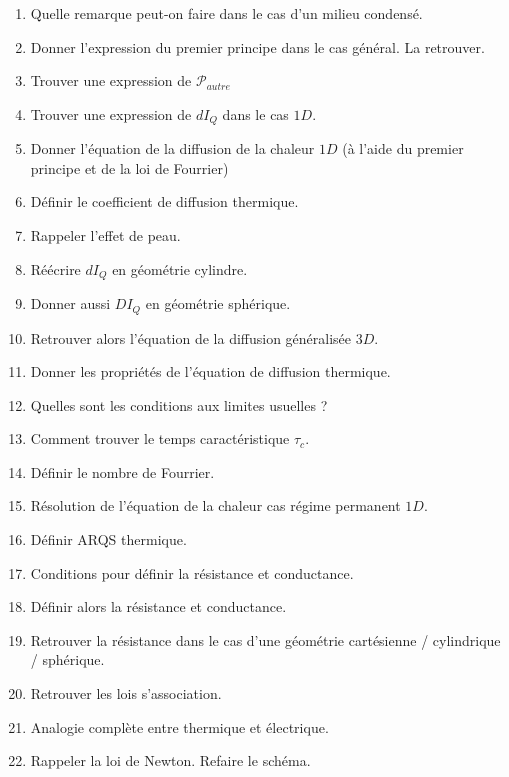 \documentclass[a4paper, 11pt, hidelinks]{article}
\begin{document}
\begin{enumerate}
    \item Quelle remarque peut-on faire dans le cas d'un milieu condensé. \cite{Chapitre20}
    \item Donner l'expression du premier principe dans le cas général. La retrouver. \cite{Chapitre20}
    \item Trouver une expression de $\mathscr{P}_{autre}$ \cite{Chapitre20}
    \item Trouver une expression de $dI_Q$ dans le cas $1D$. \cite{Chapitre20}
    \item Donner l'équation de la diffusion de la chaleur $1D$ (à l'aide du premier principe et de la loi de Fourrier) \cite{Chapitre20}
    \item Définir le coefficient de diffusion thermique. \cite{Chapitre20}
    \item Rappeler l'effet de peau. \cite{Chapitre20}
    \item Réécrire $dI_Q$ en géométrie cylindre. \cite{Chapitre20}
    \item Donner aussi $DI_Q$ en géométrie sphérique. \cite{Chapitre20}
    \item Retrouver alors l'équation de la diffusion généralisée  $3D$. \cite{Chapitre20}
    \item Donner les propriétés de l'équation de diffusion thermique. \cite{Chapitre20}
    \item Quelles sont les conditions aux limites usuelles ? \cite{Chapitre20}
    \item Comment trouver le temps caractéristique $\tau_c$. \cite{Chapitre20}
    \item Définir le nombre de Fourrier. \cite{Chapitre20}
    \item Résolution de l'équation de la chaleur cas régime permanent $1D$. \cite{Chapitre20}
    \item Définir ARQS thermique.\cite{Chapitre20}
    \item Conditions pour définir la résistance et conductance. \cite{Chapitre20}
    \item Définir alors la résistance et conductance. \cite{Chapitre20}
    \item Retrouver la résistance dans le cas d'une géométrie cartésienne / cylindrique / sphérique. \cite{Chapitre20}
    \item Retrouver les lois s'association. \cite{Chapitre20}
    \item Analogie complète entre thermique et électrique. \cite{Chapitre20}
    \item Rappeler la loi de Newton. Refaire le schéma. \cite{Chapitre20}

\end{enumerate}
\end{document}
